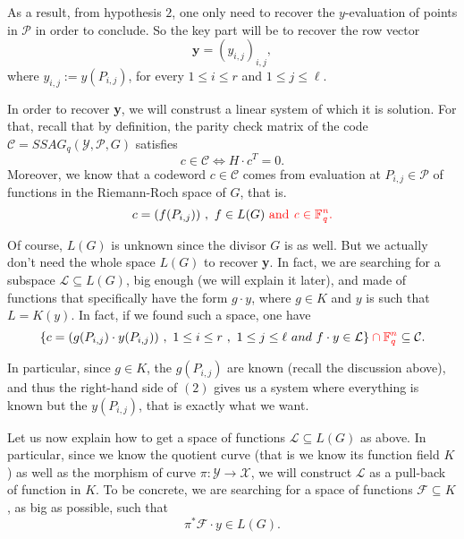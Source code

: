 \documentclass[10pt]{article}
\newcommand{\s}{\vspace{0.3cm}}
\newcommand{\cd}{\cdot}
\newcommand{\fq}{\mathbb{F}_q}
\newcommand{\su}{\subseteq}
\newcommand{\X}{\mathcal{X}}
\newcommand{\Y}{\mathcal{Y}}
\newcommand{\PR}{\mathcal{P}}
\begin{document}
As a result, from hypothesis $2$, one only need to recover the $y$-evaluation of points in $\PR$ in order to conclude. So the key part will be to recover the row vector
\begin{equation}
\textbf{y} = (y_{i,j})_{i,j},
\end{equation}
where $y_{i,j} := y(P_{i,j})$, for every $1 \leq i \leq r$ and $1 \leq j \leq \ell$.

\s

In order to recover \textbf{y}, we will construst a linear system of which it is solution. For that, recall that by definition, the parity check matrix of the code $\mathcal{C}=SSAG_q(\Y,\PR,G)$ satisfies
\begin{equation}
c \in \mathcal{C} \iff H \cd c^T = 0.
\end{equation}
Moreover, we know that a codeword $c \in \mathcal{C}$ comes from evaluation at $P_{i,j} \in \PR$ of functions in the Riemann-Roch space of $G$, that is.
\[c = (f(P_{i,j})) \ , \ f \in L(G) \ \rm \color{red} and \ \it c \in \fq^n. \color{black}\]

Of course, $L(G)$ is unknown since the divisor $G$ is as well. But we actually don't need the whole space $L(G)$ to recover \textbf{y}. In fact, we are searching for a subspace $\mathcal{L} \su L(G)$, big enough (we will explain it later), and made of functions that specifically have the form $g \cd y$, where $g \in K$ and $y$ is such that $L=K(y)$. In fact, if we found such a space, one have 
\[\{c= (g(P_{i,j}) \cd y(P_{i,j})) \ , \ 1 \leq i \leq r \ , \ 1 \leq j \leq \ell \ and \ f\cd y \in \mathcal{L}\} \color{red} \cap \fq^n \color{black} \su \mathcal{C}.\] 

In particular, since $g \in K$, the $g(P_{i,j})$ are known (recall the discussion above), and thus the right-hand side of $(2)$ gives us a system where everything is known but the $y(P_{i,j})$, that is exactly what we want.

\s

Let us now explain how to get a space of functions $\mathcal{L} \su L(G)$ as above. In particular, since we know the quotient curve (that is we know its function field $K$) as well as the morphism of curve $\pi : \Y \rightarrow \X$, we will construct $\mathcal{L}$ as a pull-back of function in $K$. To be concrete, we are searching for a space of functions $\mathcal{F} \su K$, as big as possible, such that 
\begin{equation}
\pi^*\mathcal{F} \cd y \in L(G). 
\end{equation}
\end{document}
